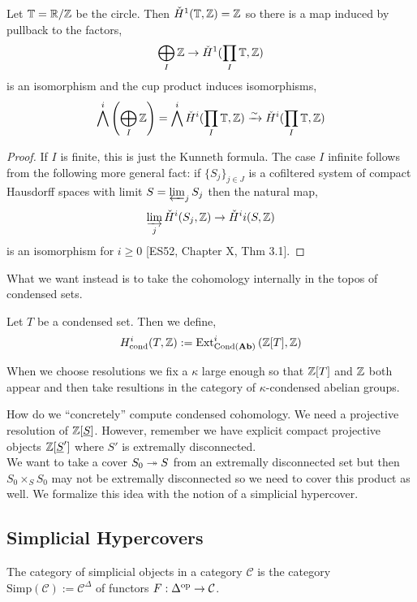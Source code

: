 \documentclass[12pt]{article}
\newcommand{\cond}{\text{cond}}
\newcommand{\Cond}{\mathrm{Cond}}
\newcommand{\cC}{\mathcal{C}}
\newcommand{\TT}{\mathbb{T}}
\newcommand{\Simp}{\mathrm{Simp}}
\begin{document}
\begin{prop}
Let $\TT = \RR / \ZZ$ be the circle. Then $\check{H}^1(\TT, \ZZ) = \ZZ$ so there is a map induced by pullback to the factors,
\[ \bigoplus_{I} \ZZ \to \check{H}^1(\prod_I \TT, \ZZ) \]
is an isomorphism and the cup product induces isomorphisms,
\[ \bigwedge^i \left( \bigoplus_I \ZZ \right) = \bigwedge^i \check{H}^i(\prod_I \TT, \ZZ) \iso \check{H}^i(\prod_I \TT, \ZZ) \]
\end{prop}

\begin{proof}
If $I$ is finite, this is just the Kunneth formula. The case $I$ infinite follows from the following more general fact: if $\{ S_j \}_{j \in J}$ is a cofiltered system of compact Hausdorff spaces with limit $S = \operatorname*{\varprojlim}_j S_j$ then the natural map,
\[ \operatorname*{\varinjlim}_{j} \check{H}^i(S_j, \mathbb{Z}) \to \check{H}^ii(S, \mathbb{Z}) \]
is an isomorphism for $i \ge 0$ [ES52, Chapter X, Thm 3.1]. 
\end{proof}

What we want instead is to take the cohomology internally in the topos of condensed sets.

\begin{defn}
Let $T$ be a condensed set. Then we define, 
\[ H^i_{\cond}(T, \Z) := \Ext{i}{\Cond(\Ab)}{\Z[T]}{\Z} \]
\end{defn}

\begin{rmk}
When we choose resolutions we fix a $\kappa$ large enough so that $\mathbb{Z}[T]$ and $\mathbb{Z}$ both appear and then take resultions in the category of $\kappa$-condensed abelian groups.
\end{rmk}

How do we ``concretely'' compute condensed cohomology. We need a projective resolution of $\mathbb{Z}[\underline{S}]$. However, remember we have explicit compact projective objects $\mathbb{Z}[\underline{S}']$ where $S'$ is extremally disconnected. 
\bigskip\\
We want to take a cover $S_0 \twoheadrightarrow S$ from an extremally disconnected set but then $S_0 \times_S S_0$ may not be extremally disconnected so we need to cover this product as well. We formalize this idea with the notion of a simplicial hypercover.

\subsection{Simplicial Hypercovers}

\begin{defn}
The category of simplicial objects in a category $\cC$ is the category $\Simp(\cC) := \cC^{\Delta}$ of functors $F : \Delta^\op \to \cC$.
\end{defn}
\end{document}

